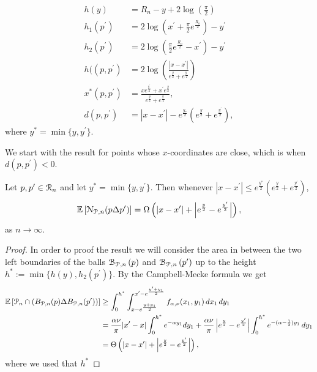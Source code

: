 \begin{appendices}
\begin{align}
	h(y) &= R_n - y + 2\log\left(\frac{\pi}{2}\right) \label{eq:def_height_y_P_n}\\
	h_1(p^\prime) &= 2\log\left(x^\prime + \frac{\pi}{2}e^{\frac{R_n}{2}}\right) - y^\prime \label{eq:def_height_left_P_n} \\
	h_2(p^\prime) &= 2\log\left(\frac{\pi}{2}e^{\frac{R_n}{2}} - x^\prime\right) - y^\prime 
		\label{eq:def_height_right_P_n} \\
	h((p,p^\prime) &= 2\log\left(\frac{|x - x^\prime|}{e^{\frac{y}{2}} + e^{\frac{y^\prime}{2}}}\right)\\
	x^\ast(p,p^\prime) &= \frac{x e^{\frac{y^\prime}{2}} + x^\prime e^{\frac{y}{2}}}{e^{\frac{y}{2}} + 	
		e^{\frac{y^\prime}{2}}},\\
	d(p,p^\prime) &= |x - x^\prime| - e^{\frac{y_\ast}{2}}\left(e^{\frac{y}{2}} + e^{\frac{y^\prime}{2}}\right),
	\label{eq:def_d_p_p_prime}
\end{align}
where $y^\ast = \min\{y,y^\prime\}$.

We start with the result for points whose $x$-coordinates are close, which is when $d(p,p^\prime) < 0$.

\begin{lemma}\label{lem:disjoint_neighbors_P_n}
Let $p, p ^\prime \in {\mathcal R}_n$ and let $y^\ast = \min\{y,y^\prime\}$. Then whenever $|x - x^\prime| \le e^{\frac{y^\ast}{2}}\left(e^{\frac{y}{2}} + e^{\frac{y^\prime}{2}}\right)$,
\[
	\mathbb{E}\left[{\mathcal N}_{{\mathcal P},n}(p \Delta p^\prime)\right] 
	= \Omega\left(|x - x^\prime| + \left|e^{\frac{y}{2}} - e^{\frac{y^\prime}{2}}\right|\right),
\]
as $n \to \infty$.
\end{lemma}

\begin{proof}
In order to proof the result we will consider the area in between the two left boundaries of the balls ${\mathcal B}_{{\mathcal P},n}\left(p\right)$ and
${\mathcal B}_{{\mathcal P},n}\left(p^\prime\right)$ up to the height $h^\ast := \min\{h(y), h_2(p^\prime)\}$. By the Campbell-Mecke formula we get
\begin{align*}
	\mathbb{E}\left[{\mathcal P}_n \cap \left(B_{{\mathcal P},n}(p) \Delta B_{{\mathcal P},n}(p^\prime)\right)\right]
	&\ge \int_0^{h^\ast} \int_{x - e^{\frac{y + y_1}{2}}}^{x^\prime - e^{\frac{y^\prime + y_1}{2}}} f_{\alpha,\nu}(x_1,y_1)
		\, dx_1 \, dy_1 \\
	&= \frac{\alpha \nu}{\pi}|x^\prime - x| \int_{0}^{h^\ast} e^{-\alpha y_1} dy_1
		+ \frac{\alpha \nu}{\pi}\left|e^{\frac{y}{2}} - e^{\frac{y^\prime}{2}}\right| \int_0^{h^\ast} 
		e^{-(\alpha-\frac{1}{2})y_1} \, dy_1\\
	&= \Theta\left(|x - x^\prime| + \left|e^{\frac{y}{2}} - e^{\frac{y^\prime}{2}}\right|\right),
\end{align*}
where we used that $h^\ast$
\end{proof}


\end{appendices}
